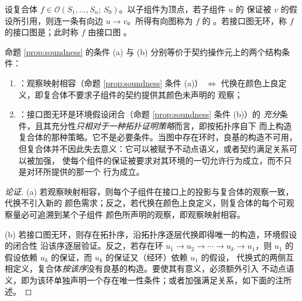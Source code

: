\begin{definition}[接口图与自由性]\label{def:interface-graph}
设复合体 $f \in \mathcal{O}(S_1,\dots,S_n;\,S_0)$。以子组件为顶点，若子组件 $u$ 的
保证被 $v$ 的假设所引用，则连一条有向边 $u \to v$。所得有向图称为 $f$ 的
。若接口图无环，称 $f$ 的接口图是；此时称 $f$ 由接口图
。
\end{definition}

\begin{proposition}[组合条件的结构刻画]\label{prop:operad-compose}
命题 \ref{prop:soundness} 的条件 (a) 与 (b) 分别等价于契约操作元上的两个结构条件：
\begin{enumerate}[label=(\alph*)]
\item {}：观察映射相容（命题 \ref{prop:soundness} 条件 (a)）
      $\iff$ 代换在颜色上良定义，即复合体不要求子组件的契约提供其颜色未声明的
      观察；
\item {}：接口图无环是环境假设闭合（命题 \ref{prop:soundness} 条件 (b)）的
      \emph{充分}条件，且其充分性\emph{只相对于一种拓扑证明策略}而言，即按拓扑序自下
      而上构造复合体的那种策略。它不是必要条件。当图中存在环时，良基的构造不可用，
      但复合体并不因此失去意义：它可以被赋予不动点语义，或者契约满足关系可以被加强，
      使每个组件的保证被要求对其环境的一切允许行为成立，而不只是对环所提供的那一个
      行为成立。
\end{enumerate}
\end{proposition}

\begin{proof}[论证]
(a) 若观察映射相容，则每个子组件在接口上的投影与复合体的观察一致，代换不引入新的
颜色需求；反之，若代换在颜色上良定义，则复合体的每个可观察量必可追溯到某个子组件
颜色所声明的观察，即观察映射相容。

(b) 若接口图无环，则存在拓扑序，沿拓扑序逐层代换即得唯一的构造，环境假设的闭合性
沿该序逐层验证。反之，若存在环 $u_1 \to u_2 \to \cdots \to u_k \to u_1$，则
$u_1$ 的假设依赖 $u_k$ 的保证，而 $u_k$ 的保证又（经环）依赖 $u_1$ 的假设，
代换式的两侧互相定义，复合体\emph{按该序}没有良基的构造。要使其有意义，必须额外引入
不动点语义，即为该环单独声明一个存在唯一性条件；或者加强满足关系，如下面的注所述。
\end{proof}

